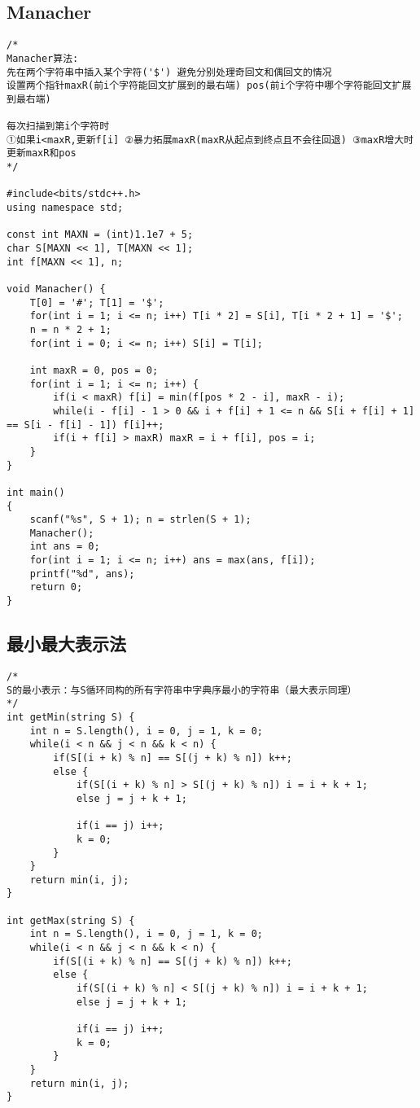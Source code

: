 \subsection{Manacher}
\begin{lstlisting}
/*
Manacher算法:
先在两个字符串中插入某个字符('$') 避免分别处理奇回文和偶回文的情况
设置两个指针maxR(前i个字符能回文扩展到的最右端) pos(前i个字符中哪个字符能回文扩展到最右端)

每次扫描到第i个字符时
①如果i<maxR,更新f[i] ②暴力拓展maxR(maxR从起点到终点且不会往回退) ③maxR增大时更新maxR和pos
*/

#include<bits/stdc++.h>
using namespace std;

const int MAXN = (int)1.1e7 + 5;
char S[MAXN << 1], T[MAXN << 1];
int f[MAXN << 1], n;

void Manacher() {
	T[0] = '#'; T[1] = '$';
	for(int i = 1; i <= n; i++) T[i * 2] = S[i], T[i * 2 + 1] = '$';
	n = n * 2 + 1;
	for(int i = 0; i <= n; i++) S[i] = T[i];
	
	int maxR = 0, pos = 0;
	for(int i = 1; i <= n; i++) {
		if(i < maxR) f[i] = min(f[pos * 2 - i], maxR - i);
		while(i - f[i] - 1 > 0 && i + f[i] + 1 <= n && S[i + f[i] + 1] == S[i - f[i] - 1]) f[i]++;
		if(i + f[i] > maxR) maxR = i + f[i], pos = i;
	}
}

int main()
{
	scanf("%s", S + 1); n = strlen(S + 1);
	Manacher();
	int ans = 0;
	for(int i = 1; i <= n; i++) ans = max(ans, f[i]);
	printf("%d", ans);
	return 0;
}
\end{lstlisting}

\subsection{最小最大表示法}
\begin{lstlisting}
/*
S的最小表示：与S循环同构的所有字符串中字典序最小的字符串（最大表示同理） 
*/
int getMin(string S) {
	int n = S.length(), i = 0, j = 1, k = 0;
	while(i < n && j < n && k < n) {
		if(S[(i + k) % n] == S[(j + k) % n]) k++;
		else {
			if(S[(i + k) % n] > S[(j + k) % n]) i = i + k + 1;
			else j = j + k + 1;
			
			if(i == j) i++;
			k = 0;
		}
	}
	return min(i, j);
}

int getMax(string S) {
  	int n = S.length(), i = 0, j = 1, k = 0;
	while(i < n && j < n && k < n) {
		if(S[(i + k) % n] == S[(j + k) % n]) k++;
		else {
			if(S[(i + k) % n] < S[(j + k) % n]) i = i + k + 1;
			else j = j + k + 1;
			
			if(i == j) i++;
			k = 0;
		}
	}
	return min(i, j);
}
\end{lstlisting}

